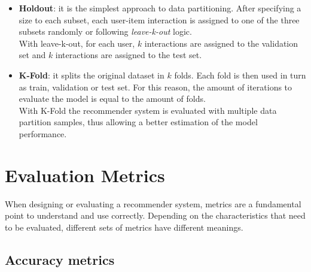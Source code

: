 \begin{itemize}
\item \textbf{Holdout}: it is the simplest approach to data partitioning. After specifying a size to each subset, each user-item interaction is assigned to one of the three subsets randomly or following \textit{leave-k-out} logic.\\
With leave-k-out, for each user, $k$ interactions are assigned to the validation set and $k$ interactions are assigned to the test set.
\item \textbf{K-Fold}: it splits the original dataset in $k$ folds. Each fold is then used in turn as train, validation or test set. For this reason, the amount of iterations to evaluate the model is equal to the amount of folds.\\
With K-Fold the recommender system is evaluated with multiple data partition samples, thus allowing a better estimation of the model performance.
\end{itemize}



\section{Evaluation Metrics}

When designing or evaluating a recommender system, metrics are a fundamental point to understand and use correctly. Depending on the characteristics that need to be evaluated, different sets of metrics have different meanings.


\subsection{Accuracy metrics}

